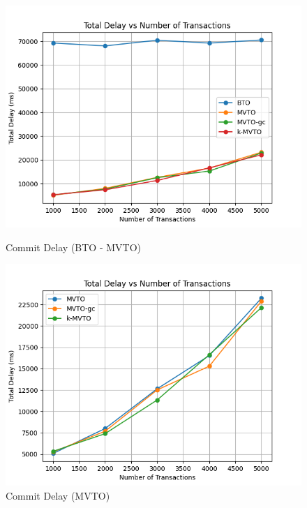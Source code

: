 \documentclass[12pt]{article}
\begin{document}
\begin{figure}[h]
    \centering
    \begin{minipage}[b]{0.45\textwidth}
        \includegraphics[width=\textwidth]{./images/NumTransTD.png}
        \caption{Commit Delay (BTO - MVTO)}
        \label{fig:numTransTD}
    \end{minipage}
    \hfill
    \begin{minipage}[b]{0.45\textwidth}
        \includegraphics[width=\textwidth]{./images/MVTOnumTransTD.png}
        \caption{Commit Delay (MVTO)}
        \label{fig:MVTOnumTransTD}
    \end{minipage}
\end{figure}\\
\end{document}
